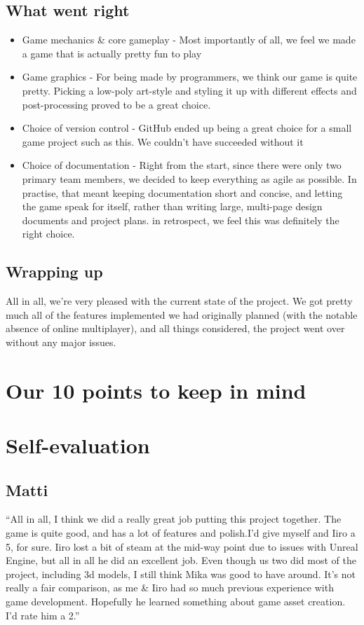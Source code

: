 \documentclass[
  oneside,
  11pt, a4paper,
  footinclude=true,
  headinclude=true,
  cleardoublepage=empty
]{scrbook}
\begin{document}
\section{What went right}
\begin{itemize}
\item Game mechanics \& core gameplay - Most importantly of all, we feel we made a game that is actually pretty fun to play
\item Game graphics - For being made by programmers, we think our game is quite pretty. Picking a low-poly art-style and styling it up with different effects and post-processing proved to be a great choice.
\item Choice of version control  - GitHub ended up being a great choice for a small game project such as this. We couldn't  have succeeded without it
\item Choice of documentation - Right from the start, since there were only two primary team members, we decided to keep everything as agile as possible. In practise, that meant keeping documentation short and concise, and letting the game speak for itself, rather than writing large, multi-page design documents and project plans. in retrospect, we feel this was definitely the right choice.
\end{itemize}
\section{Wrapping up}
All in all, we're very pleased with the current state of the project. We got pretty much all of the features implemented we had originally planned (with the notable absence of online multiplayer), and all things considered, the project went over without any major issues.
\chapter{Our 10 points to keep in mind}

\chapter{Self-evaluation}
\section{Matti}
``All in all, I think we did a really great job putting this project together. The game is quite good, and has a lot of features and polish.I'd give myself and Iiro a 5, for sure. Iiro lost a bit of steam at the mid-way point due to issues with Unreal Engine, but all in all he did an excellent job. Even though us two did most of the project, including 3d models, I still think Mika was good to have around. It's not really a fair comparison, as me \& Iiro had so much previous experience with game development. Hopefully he learned something about game asset creation. I'd rate him a 2.''
\end{document}
